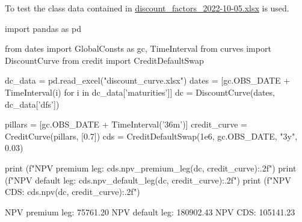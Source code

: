 
To test the class data contained in \href{https://github.com/matteosan1/finance_course/raw/master/input_files/discount_factors_2022-10-05.xlsx}{discount\_factors\_2022-10-05.xlsx} is used.

\begin{ipythonnon}
import pandas as pd

from dates import GlobalConsts as gc, TimeInterval
from curves import DiscountCurve
from credit import CreditDefaultSwap

dc_data = pd.read_excel("discount_curve.xlsx")
dates = [gc.OBS_DATE + TimeInterval(i) for i in dc_data['maturities']]
dc = DiscountCurve(dates, dc_data['dfs'])

pillars = [gc.OBS_DATE + TimeInterval('36m')]
credit_curve = CreditCurve(pillars, [0.7])
cds = CreditDefaultSwap(1e6, gc.OBS_DATE, "3y", 0.03)

print (f"NPV premium leg: {cds.npv_premium_leg(dc, credit_curve):.2f}")
print (f"NPV default leg: {cds.npv_default_leg(dc, credit_curve):.2f}")
print (f"NPV CDS: {cds.npv(dc, credit_curve):.2f}")
\end{ipythonnon}
\begin{ioutput}
NPV premium leg: 75761.20
NPV default leg: 180902.43
NPV CDS: 105141.23
\end{ioutput}
	
